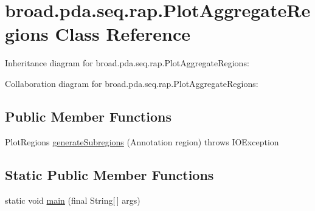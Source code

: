 \hypertarget{classbroad_1_1pda_1_1seq_1_1rap_1_1_plot_aggregate_regions}{\section{broad.\+pda.\+seq.\+rap.\+Plot\+Aggregate\+Regions Class Reference}
\label{classbroad_1_1pda_1_1seq_1_1rap_1_1_plot_aggregate_regions}
}


Inheritance diagram for broad.\+pda.\+seq.\+rap.\+Plot\+Aggregate\+Regions\+:


Collaboration diagram for broad.\+pda.\+seq.\+rap.\+Plot\+Aggregate\+Regions\+:
\subsection*{Public Member Functions}
\begin{DoxyCompactItemize}
\item 
Plot\+Regions \hyperlink{classbroad_1_1pda_1_1seq_1_1rap_1_1_plot_aggregate_regions_a346e5ff0aec512e849bdba8343db1b25}{generate\+Subregions} (Annotation region)  throws I\+O\+Exception 
\end{DoxyCompactItemize}
\subsection*{Static Public Member Functions}
\begin{DoxyCompactItemize}
\item 
static void \hyperlink{classbroad_1_1pda_1_1seq_1_1rap_1_1_plot_aggregate_regions_a8a38014e6297abcc1a4a1f06068626f2}{main} (final String\mbox{[}$\,$\mbox{]} args)
\end{DoxyCompactItemize}
